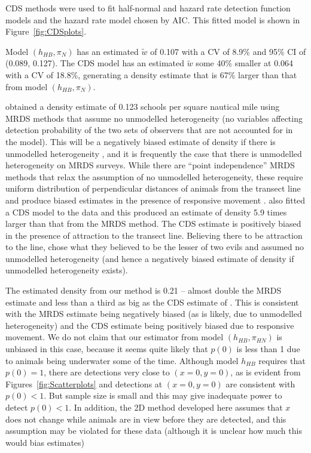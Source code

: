 \documentclass[useAMS,usenatbib,referee]{biom}
\begin{document}
CDS methods were used to fit half-normal and hazard rate detection function models and the hazard rate model chosen by AIC. This fitted model is shown in Figure~\ref{fig:CDSplots}.

Model $(h_{HB},\pi_{N})$ has an estimated $\tilde{w}$ of 0.107 with a CV of 8.9\% and 95\% CI of (0.089, 0.127). The CDS model has an estimated $\tilde{w}$ some 40\% smaller at 0.064 with a CV of 18.8\%, generating a density estimate that is 67\% larger than that from model $(h_{HB},\pi_{N})$.

\cite{Canadas+al:04} obtained a density estimate of 0.123 schools per square nautical mile using MRDS methods that assume no unmodelled heterogeneity (no variables affecting detection probability of the two sets of observers that are not accounted for in the model). This will be a negatively biased estimate of density if there is unmodelled heterogeneity \citep[see][for a summary of this and related issues]{Burt+al:15}, and it is frequently the case that there is unmodelled heterogeneity on MRDS surveys. While there are ``point independence'' MRDS methods that relax the assumption of no unmodelled heterogeneity, these require uniform distribution of perpendicular distances of animals from the transect line and produce biased estimates in the presence of responsive movement \citep[see][]{Burt+al:15}. \cite{Canadas+al:04} also fitted a CDS model to the data and this produced an estimate of density 5.9 times larger than that from the MRDS method. The CDS estimate is positively biased in the presence of attraction to the transect line. Believing there to be attraction to the line, \cite{Canadas+al:04} chose what they believed to be the lesser of two evils and assumed no unmodelled heterogeneity (and hence a negatively biased estimate of density if unmodelled heterogeneity exists).

The estimated density from our method is 0.21 -- almost double the MRDS estimate and less than a third as big as the CDS estimate of \cite{Canadas+al:04}. This is consistent with the MRDS estimate being negatively biased (as is likely, due to unmodelled heterogeneity) and the CDS estimate being positively biased due to responsive movement. We do not claim that our estimator from model $(h_{HB},\pi_{HN})$ is unbiased in this case, because it seems quite likely that $p(0)$ is less than 1 \citep[][estimated it to be 0.79]{Canadas+al:04} due to animals being underwater some of the time. Although model $h_{HB}$ requires that $p(0)=1$, there are detections very close to $(x=0,y=0)$, as is evident from Figures~\ref{fig:Scatterplots} and detections at $(x=0,y=0)$ are consistent with $p(0)<1$. But sample size is small and this may give inadequate power to detect $p(0)<1$. In addition, the 2D method developed here assumes that $x$ does not change while animals are in view before they are detected, and this assumption may be violated for these data (although it is unclear how much this would bias estimates)
\end{document}
